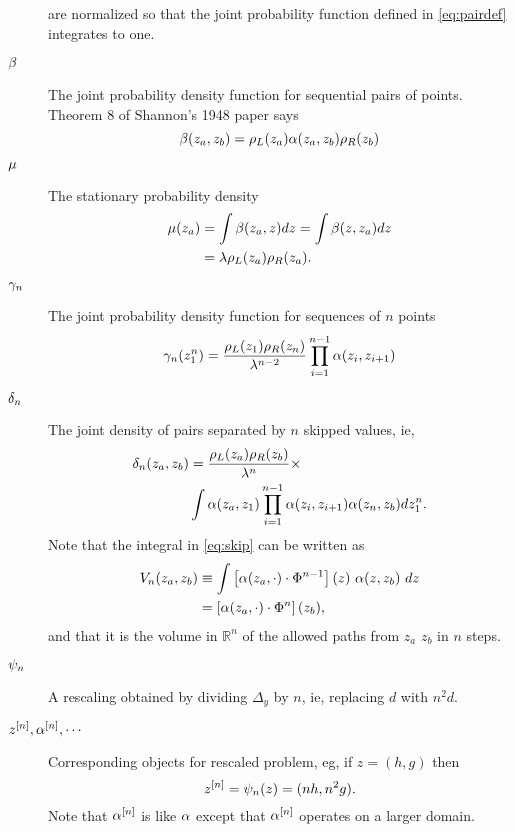 \documentclass[twocolumn]{article}
\newcommand{\field}[1]{\mathbb{#1}}
\newcommand\REAL{\field{R}}
\begin{document}
\begin{description}
  are normalized so that the joint probability function defined in
  \eqref{eq:pairdef} integrates to one.
\item[$\beta$] The joint probability density function for sequential
  pairs of points.  Theorem 8 of Shannon's 1948 paper says
  \begin{equation}
    \label{eq:pairdef}
    \beta(z_a,z_b) = \rho_L(z_a) \alpha(z_a,z_b) \rho_R(z_b)
  \end{equation}
\item[$\mu$] The stationary probability density
  \begin{align}
    \mu(z_a) &= \int \beta(z_a,z) dz = \int \beta(z,z_a) dz
                       \nonumber \\
    \label{eq:stationary}
                     &= \lambda \rho_L(z_a) \rho_R(z_a).
  \end{align}
\item[$\gamma_{n}$] The joint probability density function for
  sequences of $n$ points
  \begin{equation}
    \label{eq:ptuple}
    \gamma_{n}(z_{1}^{n}) = \frac{\rho_L(z_1)
      \rho_R(z_n)}{\lambda^{n-2}} \prod_{i=1}^{n-1} \alpha(z_i,z_{i+1})
  \end{equation}
\item[$\delta_{n}$] The joint density of pairs separated by $n$ skipped
  values, ie,
  \begin{align}
    \delta_{n}(z_a,z_b) &= \frac{\rho_L(z_a) \rho_R(z_b)}{\lambda^n}
                        \times \nonumber \\
    \label{eq:skip}
                      & \int \alpha(z_a,z_1) \prod_{i=1}^{n-1}
                        \alpha(z_i,z_{i+1}) \alpha(z_n,z_b) d
                        z_{1}^{n}.
  \end{align}
  Note that the integral in \eqref{eq:skip} can be written as
  \begin{align}
    V_n(z_a,z_b) &\equiv \int \left[ \alpha(z_a,\cdot) \cdot
      \Phi^{n-1} \right] (z)~ \alpha(z,z_b)~ dz \nonumber \\
    \label{eq:volume}
    &= \left[ \alpha(z_a,\cdot) \cdot \Phi^{n} \right] (z_b),
  \end{align}
  and that it is the volume in $\REAL^n$ of the allowed paths from
  $z_a$ $z_b$ in $n$ steps.
\item[$\psi_{n}$] A rescaling obtained by dividing $\Delta_y$ by $n$,
  ie, replacing $d$ with $n^2d$.
\item[$z^{[n]}, \alpha^{[n]},\cdots $] Corresponding objects for
  rescaled problem, eg, if $z=(h,g)$ then
  \begin{equation*}
    z^{[n]} = \psi_{n}(z) = (nh, n^2g).
  \end{equation*}
  Note that $\alpha^{[n]}$ is like $\alpha$ except that
  $\alpha^{[n]}$ operates on a larger domain.
\end{description}
\end{document}
